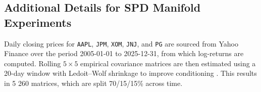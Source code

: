 \documentclass{article}
\theoremstyle{definition}
\theoremstyle{remark}
\begin{document}
\subsection{Additional Details for SPD Manifold Experiments}
Daily closing prices for \texttt{AAPL}, \texttt{JPM}, \texttt{XOM}, \texttt{JNJ}, and \texttt{PG} are sourced from Yahoo Finance over the period 2005-01-01 to 2025-12-31, from which log-returns are computed. Rolling $5 \times 5$ empirical covariance matrices are then estimated using a 20-day window with Ledoit--Wolf shrinkage to improve conditioning \cite{Ledoit2004}. This results in 5 260 matrices, which are split 70/15/15\% across time.

\newpage

\end{document}
